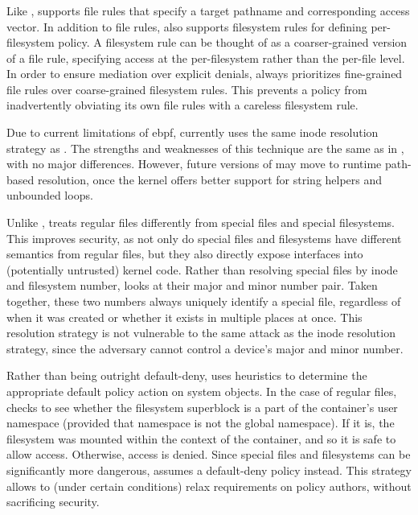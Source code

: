 \subsubsection{\bpfcontain{}}

Like \bpfbox{}, \bpfcontain{} supports file rules that specify a target pathname and
corresponding access vector. In addition to file rules, \bpfcontain{} also supports
filesystem rules for defining per-filesystem policy. A filesystem rule can be thought of
as a coarser-grained version of a file rule, specifying access at the per-filesystem
rather than the per-file level. In order to ensure mediation over explicit denials,
\bpfcontain{} always prioritizes fine-grained file rules over coarse-grained filesystem
rules. This prevents a policy from inadvertently obviating its own file rules with
a careless filesystem rule.

Due to current limitations of \gls{ebpf}, \bpfcontain{} currently uses the same inode
resolution strategy as \bpfbox{}. The strengths and weaknesses of this technique are the
same as in \bpfbox{}, with no major differences. However, future versions of \bpfcontain{}
may move to runtime path-based resolution, once the kernel offers better support for
string helpers and unbounded loops.

Unlike \bpfbox{}, \bpfcontain{} treats regular files differently from special files and
special filesystems. This improves security, as not only do special files and filesystems
have different semantics from regular files, but they also directly expose interfaces into
(potentially untrusted) kernel code. Rather than resolving special files by inode and
filesystem number, \bpfcontain{} looks at their major and minor number pair. Taken
together, these two numbers always uniquely identify a special file, regardless of when it
was created or whether it exists in multiple places at once. This resolution strategy is
not vulnerable to the same attack as the inode resolution strategy, since the adversary
cannot control a device's major and minor number.

Rather than being outright default-deny, \bpfcontain{} uses heuristics to determine the
appropriate default policy action on system objects. In the case of regular files,
\bpfcontain{} checks to see whether the filesystem superblock is a part of the container's
user namespace (provided that namespace is not the global namespace). If it is, the
filesystem was mounted within the context of the container, and so it is safe to allow
access. Otherwise, access is denied. Since special files and filesystems can be
significantly more dangerous, \bpfcontain{} assumes a default-deny policy instead. This
strategy allows \bpfcontain{} to (under certain conditions) relax requirements on policy
authors, without sacrificing security.

